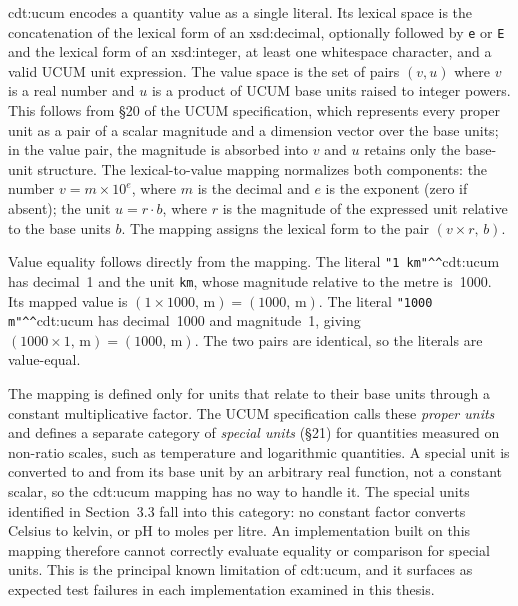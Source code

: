 \textsf{cdt:ucum} encodes a quantity value as a single literal. Its lexical space is the
concatenation of the lexical form of an \textsf{xsd:decimal}, optionally followed by
\texttt{e} or \texttt{E} and the lexical form of an \textsf{xsd:integer}, at least one
whitespace character, and a valid UCUM unit expression. The value space is the set of pairs
$(v, u)$ where $v$ is a real number and $u$ is a product of UCUM base units raised to integer
powers. This follows from §20 of the UCUM specification, which represents every proper unit
as a pair of a scalar magnitude and a dimension vector over the base units; in the value pair,
the magnitude is absorbed into $v$ and $u$ retains only the base-unit structure. The
lexical-to-value mapping normalizes both components: the number $v = m \times 10^e$, where
$m$ is the decimal and $e$ is the exponent (zero if absent); the unit $u = r \cdot b$, where
$r$ is the magnitude of the expressed unit relative to the base units $b$. The mapping assigns
the lexical form to the pair $(v \times r,\, b)$.

Value equality follows directly from the mapping. The literal
\texttt{"1 km"\^{}\^{}}\textsf{cdt:ucum} has decimal~1 and the unit \texttt{km}, whose
magnitude relative to the metre is~1000. Its mapped value is
$(1 \times 1000,\, \text{m}) = (1000,\, \text{m})$. The literal
\texttt{"1000 m"\^{}\^{}}\textsf{cdt:ucum} has decimal~1000 and magnitude~1, giving
$(1000 \times 1,\, \text{m}) = (1000,\, \text{m})$. The two pairs are identical, so the
literals are value-equal.

The mapping is defined only for units that relate to their base units through a constant
multiplicative factor. The UCUM specification calls these \emph{proper units} and defines a
separate category of \emph{special units} (§21) for quantities measured on non-ratio scales,
such as temperature and logarithmic quantities. A special unit is converted to and from its
base unit by an arbitrary real function, not a constant scalar, so the \textsf{cdt:ucum}
mapping has no way to handle it. The special units identified in Section~3.3 fall into this
category: no constant factor converts Celsius to kelvin, or pH to moles per litre. An
implementation built on this mapping therefore cannot correctly evaluate equality or comparison
for special units. This is the principal known limitation of \textsf{cdt:ucum}, and it
surfaces as expected test failures in each implementation examined in this thesis.

